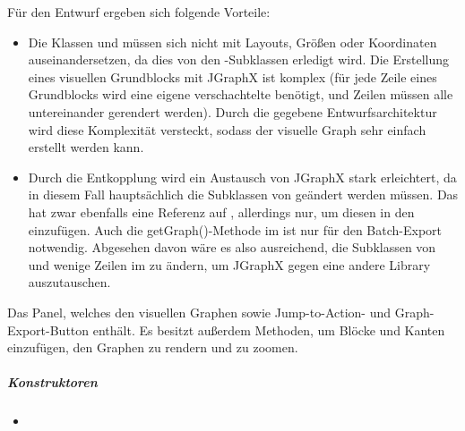 Für den Entwurf ergeben sich folgende Vorteile:
\begin{itemize}
	\item Die Klassen  und  müssen sich nicht mit Layouts, Größen oder Koordinaten auseinandersetzen, da dies von den -Subklassen erledigt wird.
	    Die Erstellung eines visuellen Grundblocks mit JGraphX ist komplex (für jede Zeile eines Grundblocks wird eine eigene verschachtelte  benötigt, und Zeilen müssen alle untereinander gerendert werden).
	    Durch die gegebene Entwurfsarchitektur wird diese Komplexität versteckt, sodass der visuelle Graph sehr einfach erstellt werden kann.
	\item Durch die Entkopplung wird ein Austausch von JGraphX stark erleichtert, da in diesem Fall hauptsächlich die Subklassen von  geändert werden müssen.
        Das  hat zwar ebenfalls eine Referenz auf , allerdings nur, um diesen in den  einzufügen. 
        Auch die getGraph()-Methode im  ist nur für den Batch-Export notwendig.
        Abgesehen davon wäre es also ausreichend, die Subklassen von  und wenige Zeilen im  zu ändern, um JGraphX gegen eine andere Library auszutauschen.
        
\end{itemize}



Das Panel, welches den visuellen Graphen sowie Jump-to-Action- und Graph-Export-Button enthält. 
Es besitzt außerdem Methoden, um Blöcke und Kanten einzufügen, den Graphen zu rendern und zu zoomen.

\subparagraph{Konstruktoren} %
\begin{itemize}
	\item {}
\end{itemize}

